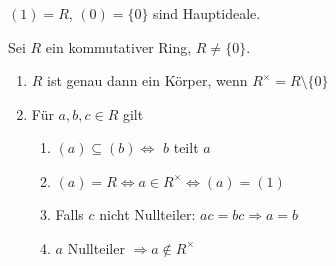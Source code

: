 \documentclass[12pt,a4paper]{scrartcl}
\begin{document}
\begin{bsp}
	$(1) = R$, $(0) = \{0\}$ sind Hauptideale.
\end{bsp}

\begin{lem} \label{lem:komring}
	Sei $R$ ein kommutativer Ring, $R\neq \{0\}$.\begin{enumerate}
		\item $R$ ist genau dann ein Körper, wenn $R^{\times} = R\setminus\{0\}$
		\item Für $a,b,c\in R$ gilt \begin{enumerate}
			\item $(a)\subseteq (b)\Leftrightarrow$ $b$ teilt $a$
			\item $(a) = R \Leftrightarrow a\in R^{\times} \Leftrightarrow (a) = (1)$
			\item Falls $c$ nicht Nullteiler: $ac =bc \Rightarrow a =b$
			\item $a$ Nullteiler $\Rightarrow a\notin R^{\times}$
		\end{enumerate}
	\end{enumerate}
\end{lem}
\end{document}
